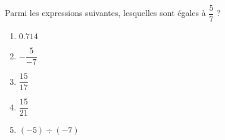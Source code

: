 
\begin{exercice}\label{exosmath-0964}

    Parmi les expressions suivantes, lesquelles sont égales à \( \dfrac{ 5 }{ 7 }\) ?
    \begin{multicols}{3}
        \begin{enumerate}
            \item
                $0.714$
            \item
                \( -\dfrac{ 5 }{ -7 }\)
            \item
                \( \dfrac{ 15 }{ 17 }\)
            \item
                \( \dfrac{ 15 }{ 21 }\)
            \item
                \( (-5)\div(-7)\)
        \end{enumerate}
    \end{multicols}

\end{exercice}
